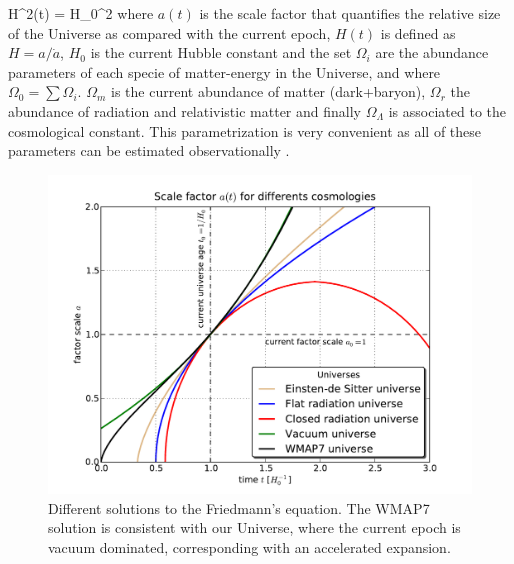 \documentclass[a4,useAMS,usenatbib,usegraphicx,12pt]{article}
\begin{document}
{ H^2(t) = H_0^2 }
where $a(t)$ is the scale factor that quantifies the relative size of the 
Universe as compared with the current epoch, $H(t)$ is defined as $H = a/
\dot a$, $H_0$ is the current Hubble constant and the set $\Omega_i$ are the
abundance parameters of each specie of matter-energy in the Universe, and where 
$\Omega_0 = \sum \Omega_i$. $\Omega_m$ is the current abundance of matter 
(dark+baryon), $\Omega_r$ the abundance of radiation and relativistic matter 
and finally $\Omega_\Lambda$ is associated to the cosmological constant. This
parametrization is very convenient as all of these parameters can be estimated
observationally \citep{Planck13XVI}.

\begin{figure}[h]
\centering

  \includegraphics[trim = 12mm 4mm 17mm 8mm, clip, keepaspectratio=true,
  width=0.4\textheight]{./figures/Friedmann_Solution.pdf}
  
  \caption{\small Different solutions to the Friedmann's equation. The WMAP7
  solution is consistent with our Universe, where the current epoch
  is vacuum dominated, corresponding with an accelerated expansion.}

  \label{fig:Friedmann}

\end{figure}
\end{document}
